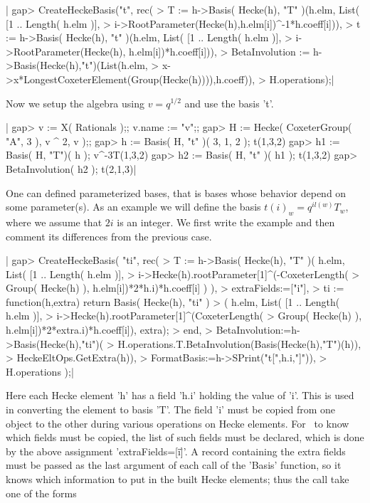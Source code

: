 |    gap> CreateHeckeBasis("t", rec(
    >   T := h->Basis( Hecke(h), "T" )(h.elm, List( [1 .. Length( h.elm )],
    >      i->RootParameter(Hecke(h),h.elm[i])^-1*h.coeff[i])),
    >   t := h->Basis( Hecke(h), "t" )(h.elm, List( [1 .. Length( h.elm )],
    >      i->RootParameter(Hecke(h), h.elm[i])*h.coeff[i])),
    >   BetaInvolution := h->Basis(Hecke(h),"t")(List(h.elm,
    >    x->x*LongestCoxeterElement(Group(Hecke(h)))),h.coeff)),
    >    H.operations);|

Now we setup the algebra using $v=q^{1/2}$ and use the basis 't'.

|    gap> v := X( Rationals );; v.name := "v";;
    gap> H := Hecke( CoxeterGroup( "A", 3 ), v ^ 2, v );;
    gap> h := Basis( H, "t" )( 3, 1, 2 );
    t(1,3,2)
    gap> h1 := Basis( H, "T")( h );
    v^-3T(1,3,2)
    gap> h2 := Basis( H, "t" )( h1 );
    t(1,3,2)
    gap> BetaInvolution( h2 );
    t(2,1,3)|


One can defined parameterized bases, that is bases whose behavior depend on
some  parameter(s). As  an example  we will  define the  basis $t(i)_w=q^{i
l(w)}T_w$,  where we  assume that  $2i$ is  an integer.  We first write the
example and then comment its differences from the previous case.

|    gap> CreateHeckeBasis( "ti", rec(
    > T := h->Basis( Hecke(h), "T" )( h.elm, List( [1 .. Length( h.elm )],
    >  i->Hecke(h).rootParameter[1]^(-CoxeterLength(
    >          Group( Hecke(h) ), h.elm[i])*2*h.i)*h.coeff[i] ) ),
    > extraFields:=["i"],
    > ti := function(h,extra) return Basis( Hecke(h), "ti" )
    >    ( h.elm, List( [1 .. Length( h.elm )],
    >    i->Hecke(h).rootParameter[1]^(CoxeterLength(
    >        Group( Hecke(h) ), h.elm[i])*2*extra.i)*h.coeff[i]), extra);
    >    end,
    > BetaInvolution:=h->Basis(Hecke(h),"ti")(
    >   H.operations.T.BetaInvolution(Basis(Hecke(h),"T")(h)),
    >   HeckeEltOps.GetExtra(h)),
    > FormatBasis:=h->SPrint("t[",h.i,"]")),
    > H.operations );|

Here  each Hecke element  'h' has a  field 'h.i' holding  the value of 'i'.
This  is used in converting the element to basis 'T'. The field 'i' must be
copied  from one  object to  the other  during various  operations on Hecke
elements.  For \CHEVIE\ to  know which fields  must be copied,  the list of
such  fields  must  be  declared,  which  is  done  by the above assignment
'extraFields\:=[\"i\"]'.  A  record  containing  the  extra  fields must be
passed  as the last  argument of each  call of the  'Basis' function, so it
knows  which information to put in the  built Hecke elements; thus the call
take one of the forms

